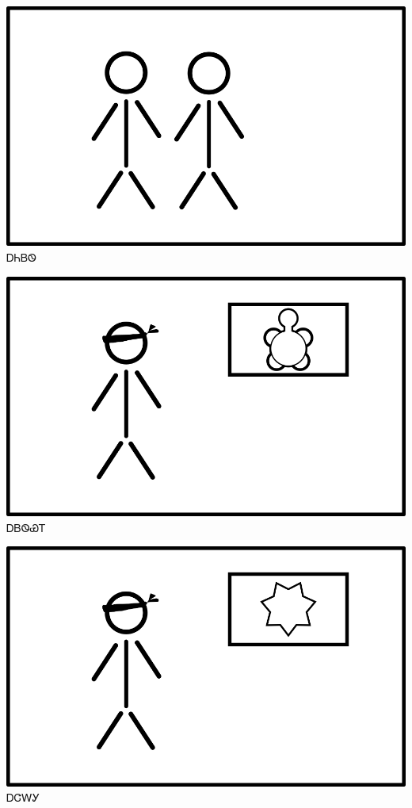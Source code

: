 \documentclass[avery5371]{flashcards}%
\begin{document}
    \begin{flashcard}{
        \includegraphics[width=0.95\columnwidth,height=.51\columnwidth,keepaspectratio]{../artwork/flags/aniyvwi-no-flag}
    }
        \Huge ᎠᏂᏴᏫ
    \end{flashcard}


    \begin{flashcard}{
        \includegraphics[width=0.95\columnwidth,height=.51\columnwidth,keepaspectratio]{../artwork/flags/adaksi-flag-blind}
    }
        \Huge ᎠᏴᏫᏯᎢ
    \end{flashcard}

    \begin{flashcard}{
        \includegraphics[width=0.95\columnwidth,height=.51\columnwidth,keepaspectratio]{../artwork/flags/ajalagi-flag-blind}
    }
        \Huge ᎠᏣᎳᎩ
    \end{flashcard}
\end{document}
